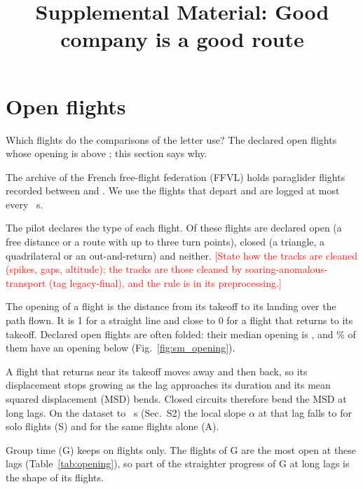 \documentclass[aps,prl,twocolumn,superscriptaddress,nofootinbib]{revtex4-2}
\newcommand{\pending}[1]{\textcolor{red}{[#1]}}
\begin{document}
\title{Supplemental Material: Good company is a good route}
\maketitle

\section{Open flights}\label{sm:open}

Which flights do the comparisons of the letter use? The declared open flights whose opening is above
\LtOpenThreshold; this section says why.

The archive of the French free-flight federation (FFVL) holds \LtFlightsAll{} paraglider flights
recorded between \LtFirstYear{} and \LtLastYear. We use the \LtOpenTotal{} flights that depart and
are logged at most every \LtLoggerMax~s.

The pilot declares the type of each flight. Of these flights \LtOpenDeclared{} are declared open (a
free distance or a route with up to three turn points), \FlightsClosed{} closed (a triangle, a
quadrilateral or an out-and-return) and \FlightsNeither{} neither. \pending{State how the tracks are cleaned (spikes, gaps, altitude); the tracks are those cleaned by
soaring-anomalous-transport (tag legacy-final), and the rule is in its preprocessing.}

The opening of a flight is the distance from its takeoff to its landing over the path flown. It is 1
for a straight line and close to 0 for a flight that returns to its takeoff. Declared open flights
are often folded: their median opening is \MedianEvery{}, and \BelowEvery\% of them have an opening
below \LtOpenThreshold{} (Fig.~\ref{fig:sm_opening}).

A flight that returns near its takeoff moves away and then back, so its displacement stops growing as
the lag approaches its duration and its mean squared displacement (MSD) bends. Closed circuits
therefore bend the MSD at long lags. On the dataset to \DeclTauLongest~s (Sec.~S2) the local slope
$\alpha$ at that lag falls to \LtDeclLongestAlphaS{} for solo flights (S) and
\LtDeclLongestAlphaA{} for the same flights alone (A).

Group time (G) keeps \LtDeclLongestAlphaG{} on \LtDeclFlightsG{} flights only. The flights of G are
the most open at these lags (Table~\ref{tab:opening}), so part of the straighter progress of G at
long lags is the shape of its flights.
\end{document}
